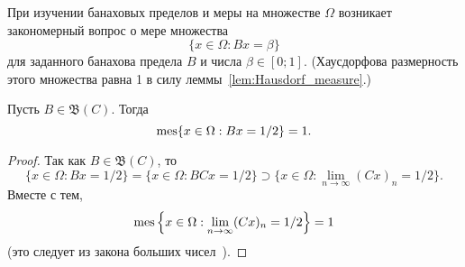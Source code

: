 При изучении банаховых пределов и меры на множестве $\Omega$
возникает закономерный вопрос о мере множества
\begin{equation}
	\{ x \in \Omega : Bx = \beta \}
\end{equation}
для заданного банахова предела $B$ и числа $\beta\in[0;1]$.
(Хаусдорфова размерность этого множества равна 1 в силу леммы~\ref{lem:Hausdorf_measure}.)

\begin{theorem}
	Пусть $B \in \mathfrak{B}(C)$.
	Тогда
	\begin{equation}
		\operatorname{mes} \{ x \in \Omega : Bx = 1/2 \} = 1
		.
	\end{equation}
\end{theorem}

\begin{proof}
	Так как $B \in \mathfrak{B}(C)$, то
	\begin{equation}
		\{ x \in \Omega : Bx = 1/2 \}
		=
		\{ x \in \Omega : BCx = 1/2 \}
		\supset
		\{ x \in \Omega : \lim_{n\to\infty} (Cx)_n = 1/2 \}
		.
	\end{equation}
	Вместе с тем,
	\begin{equation}
		\operatorname{mes} \left\{ x \in \Omega : \lim_{n\to\infty} (Cx)_n  = 1/2 \right\} = 1
	\end{equation}
	(это следует из закона больших чисел~\cite{connor1990almost}).
\end{proof}
